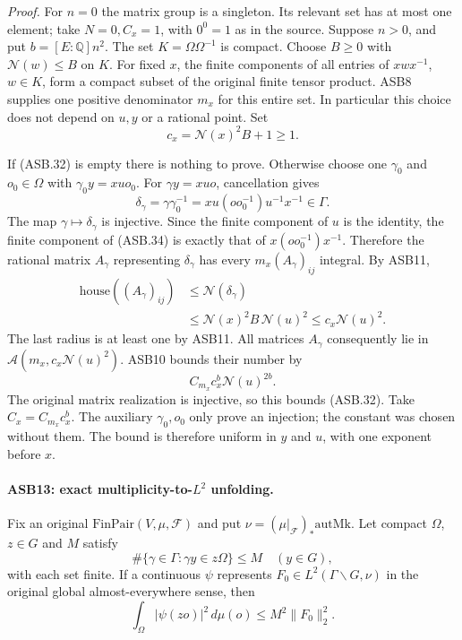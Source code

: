 \emph{Proof.}
For \(n=0\) the matrix group is a singleton.  Its relevant set
has at most one element; take \(N=0,C_x=1\), with
\(0^0=1\) as in the source.
Suppose \(n>0\), and put \(b=[E:\mathbb Q]n^2\).
The set \(K=\Omega\Omega^{-1}\) is compact.
Choose \(B\ge0\) with \(\mathcal N(w)\le B\) on \(K\).
For fixed \(x\), the finite components of all entries of
\(xwx^{-1}\), \(w\in K\), form a compact subset of the
original finite tensor product.  ASB8 supplies one positive
denominator \(m_x\) for this entire set.  In particular this
choice does not depend on \(u,y\) or a rational point.
Set
\[
                       c_x=\mathcal N(x)^2B+1\ge1.
 \tag{ASB.33}
\]

If (ASB.32) is empty there is nothing to prove.  Otherwise choose
one \(\gamma_0\) and \(o_0\in\Omega\) with
\(\gamma_0y=xuo_0\).  For \(\gamma y=xuo\), cancellation gives
\[
 \delta_\gamma=\gamma\gamma_0^{-1}
                =xu(oo_0^{-1})u^{-1}x^{-1}\in\Gamma.
 \tag{ASB.34}
\]
The map \(\gamma\mapsto\delta_\gamma\) is injective.
Since the finite component of \(u\) is the identity, the finite
component of (ASB.34) is exactly that of
\(x(oo_0^{-1})x^{-1}\).
Therefore the rational matrix \(A_\gamma\) representing
\(\delta_\gamma\) has every \(m_x(A_\gamma)_{ij}\) integral.
By ASB11,
\[
 \begin{split}
 \mathrm{house}((A_\gamma)_{ij})
 &\le\mathcal N(\delta_\gamma)\\
 &\le\mathcal N(x)^2B\,\mathcal N(u)^2
 \le c_x\mathcal N(u)^2 .
 \end{split}
 \tag{ASB.35}
\]
The last radius is at least one by ASB11.
All matrices \(A_\gamma\) consequently lie in
\(\mathcal A(m_x,c_x\mathcal N(u)^2)\).
ASB10 bounds their number by
\[
              C_{m_x}c_x^b\mathcal N(u)^{2b}.
 \tag{ASB.36}
\]
The original matrix realization is injective, so this bounds
(ASB.32).  Take \(C_x=C_{m_x}c_x^b\).
The auxiliary \(\gamma_0,o_0\) only prove an injection; the
constant was chosen without them.  The bound is therefore
uniform in \(y\) and \(u\), with one exponent before \(x\).

\paragraph{ASB13: exact multiplicity-to-\(L^2\) unfolding.}
\label{claim:ASB13}
Fix an original \(\mathrm{FinPair}(V,\mu,\mathcal F)\) and put
\(\nu=(\mu|_{\mathcal F})_*\mathrm{autMk}\).
Let compact \(\Omega\), \(z\in G\) and \(M\) satisfy
\[
          \#\{\gamma\in\Gamma:\gamma y\in z\Omega\}\le M
                       \quad(y\in G),
 \tag{ASB.37}
\]
with each set finite.  If a continuous \(\psi\) represents
\(F_0\in L^2(\Gamma\backslash G,\nu)\) in the original global
almost-everywhere sense, then
\[
                 \int_\Omega|\psi(zo)|^2\,d\mu(o)
                                   \le M^2\|F_0\|_2^2.
 \tag{ASB.38}
\]

